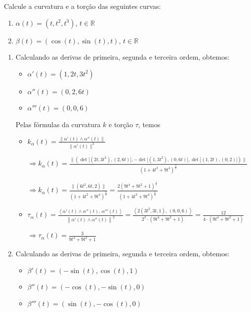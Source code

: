\documentclass[../main.tex]{subfiles}
\begin{document}
\begin{exercicio}{14}
	Calcule a curvatura e a torção das seguintes curvas:
	\begin{enumerate}[label=\alph*)]
		\item $\alpha(t)=(t, t^2, t^3)$, $t\in \mathbb{R}$
		\item $\beta(t)=(\cos(t), \sin(t), t)$, $t\in \mathbb{R}$
	\end{enumerate}
\end{exercicio}

\begin{solucao}
	\begin{enumerate}[label=\alph*)]
		\item 
		Calculando as derivas de primeira, segunda e terceira ordem, obtemos:
		\begin{itemize}
			\item $\alpha'(t)=(1,2t,3t^2)$
			\item $\alpha''(t)=(0,2,6t)$
			\item $\alpha'''(t)=(0,0,6)$
		\end{itemize}
		
		Pelas fórmulas da curvatura $k$ e torção $\tau$, temos
		
		\begin{itemize}
			\item 
			$k_\alpha(t)=\frac{\|\alpha'(t) \wedge \alpha''(t)\|}{\|\alpha'(t)\|^3}$
			
			$\Rightarrow k_\alpha(t)=\frac{\|(\det\big[ (2t,3t^2), (2,6t)\big],-\det\big[(1,3t^2),(0,6t)\big], \det\big[ (1,2t), (0,2)\big])\|}{(1+4t^2+9t^4)^{\frac{3}{2}}}$
			
			$\Rightarrow k_\alpha(t)=\frac{\|(6t^2,6t,2)\|}{(1+4t^2+9t^4)^{\frac{3}{2}}}=\frac{2(9t^4+9t^2+1)^{\frac{1}{2}}}{(1+4t^2+9t^4)^{\frac{3}{2}}}$
			
			\item $\tau_\alpha(t)=\frac{\left\langle \alpha'(t) \wedge \alpha''(t), \, \alpha'''(t) \right\rangle}{\left\|\alpha'(t) \wedge \alpha''(t)\right\|^2}=\frac{\left\langle 2(3t^2,3t,1), \, (0,0,6) \right\rangle}{2^2\cdot (9t^4+9t^2+1)}=\frac{12}{4\cdot(9t^4+9t^2+1)}$
			
			$\Rightarrow \tau_\alpha(t)=\frac{3}{9t^4+9t^2+1}$
		\end{itemize}
		
		\item 
		Calculando as derivas de primeira, segunda e terceira ordem, obtemos:
		\begin{itemize}
			\item $\beta'(t)=(-\sin(t),\cos(t),1)$
			\item $\beta''(t)=(-\cos(t),-\sin(t),0)$
			\item $\beta'''(t)=(\sin(t),-\cos(t),0)$
		\end{itemize}
		

\end{enumerate}
\end{solucao}
\end{document}
